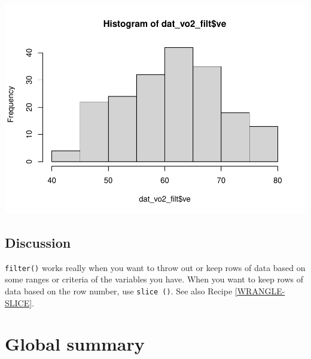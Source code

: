 \documentclass[
]{book}
\newenvironment{Shaded}{\begin{snugshade}}{\end{snugshade}}
\newcommand{\CommentTok}[1]{\textcolor[rgb]{0.56,0.35,0.01}{\textit{#1}}}
\newcommand{\DecValTok}[1]{\textcolor[rgb]{0.00,0.00,0.81}{#1}}
\newcommand{\FunctionTok}[1]{\textcolor[rgb]{0.00,0.00,0.00}{#1}}
\newcommand{\NormalTok}[1]{#1}
\newcommand{\OtherTok}[1]{\textcolor[rgb]{0.56,0.35,0.01}{#1}}
\newcommand{\SpecialCharTok}[1]{\textcolor[rgb]{0.00,0.00,0.00}{#1}}
\begin{document}
\begin{Shaded}
\end{Shaded}

\includegraphics{se201_stats_book_files/figure-latex/unnamed-chunk-112-3.pdf}

\hypertarget{discussion-4}{%
\subsection{Discussion}\label{discussion-4}}

\texttt{filter()} works really when you want to throw out or keep rows of data based on some ranges or criteria of the variables you have. When you want to keep rows of data based on the row number, use \texttt{slice\ ()}. See also Recipe \ref{WRANGLE-SLICE}.

\hypertarget{WRANGLE-SUMMARIZE-GLOBAL}{%
\section{Global summary}\label{WRANGLE-SUMMARIZE-GLOBAL}}
\end{document}
